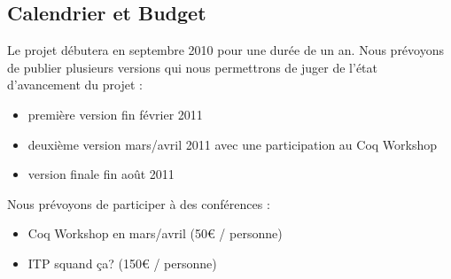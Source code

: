 \documentclass[11pt]{article}
\begin{document}
\subsection{Calendrier et Budget}

Le projet débutera en septembre 2010 pour une durée de un an.
Nous prévoyons de publier plusieurs versions qui nous permettrons de juger de l'état d'avancement du projet : 
\begin{itemize}
\item première version fin février 2011
\item deuxième version mars/avril 2011 avec une participation au Coq Workshop
\item version finale fin août 2011
\end{itemize}

Nous prévoyons de participer à des conférences :
\begin{itemize}
	\item Coq Workshop en mars/avril (50€ / personne)
	\item ITP squand ça? (150€ / personne) 
\end{itemize}

\printbibliography
\end{document}
